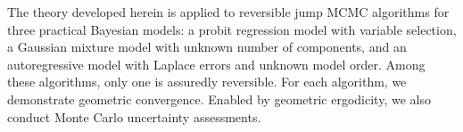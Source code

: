 \documentclass[12pt]{article}
\begin{document}
%	



The theory developed herein is applied to reversible jump MCMC algorithms for three practical Bayesian models:
a probit regression model with variable selection, a Gaussian mixture model with unknown number of components, and an autoregressive model with Laplace errors and unknown model order.
Among these algorithms, only one is assuredly reversible. 
For each algorithm, we demonstrate geometric convergence. 
Enabled by geometric ergodicity, we also conduct Monte Carlo uncertainty assessments.

\end{document}
